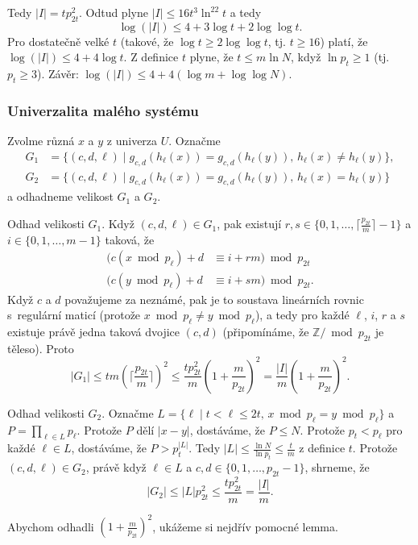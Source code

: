 \documentclass[a4paper,12pt]{article}
\begin{document}
Tedy $|I|=tp_{2t}^2$.   
Odtud plyne $|I|\le 16t^3\ln^22t$ a tedy 
$$\log(|I|)\le 4+3\log t+2\log\log t.$$
Pro dostatečně velké $t$ (takové, že $\log t\ge 2\log\log 
t$, tj. $t\ge 16$) platí, 
že $\log(|I|)\le 4+4\log t$.  Z definice $t$ plyne, 
že $t\le m\ln N$, když $\ln p_t\ge 1$ (tj.  $p_t\ge 3$).\newline 
Závěr: $\log(|I|)\le 4+4(\log m+\log\log N)$. 

\subsubsection{Univerzalita malého systému}

Zvolme různá $x$ a $y$ z univerza $U$. 
Označme
\begin{align*} G_1&=\{(c,d,\ell )\mid g_{c,d}(h_{\ell}(x))=g_{c,d}(h_{\ell}
(y)),\,h_{\ell}(x)\ne h_{\ell}(y)\},\\
G_2&=\{(c,d,\ell )\mid g_{c,d}(h_{\ell}(x))=g_{c,d}(h_{\ell}(y)),\,
h_{\ell}(x)=h_{\ell}(y)\}\end{align*}
a odhadneme velikost $G_1$ a $G_2$. 

Odhad velikosti $G_1$. Když $(c,d,\ell )\in G_1$, pak 
existují $r,s\in \{0,1,\dots,\lceil\frac {p_{2t}}m\rceil -1\}$ a $
i\in \{0,1,\dots,m-1\}$ 
taková, že 
\begin{align*}(c(x\bmod p_{\ell})+d&\equiv i+rm)\bmod p_{2t}\\
(c(y\bmod p_{\ell})+d&\equiv i+sm)\bmod p_{2t}.\end{align*}
Když $c$ a $d$ považujeme za neznámé, pak je to  
soustava lineár\-ních rovnic s~regulární maticí (protože 
$x\bmod p_{\ell}\ne y\bmod p_{\ell}$), a tedy pro každé $\ell$, $
i$, $r$ a $s$ 
existuje právě jedna taková dvojice $(c,d)$ (připomínáme, že $\mathbb Z/\bmod p_{2t}$ je těleso). Proto 
$$|G_1|\le tm(\lceil\frac {p_{2t}}m\rceil )^2\le\frac {tp_{2t}^2}
m(1+\frac m{p_{2t}})^2=\frac {|I|}m(1+\frac m{p_{2t}})^2.$$

Odhad velikosti $G_2$. Označme 
$L=\{\ell\mid t<\ell\le 2t,\,x\bmod p_{\ell}=y\bmod p_{\ell}\}$ a $
P=\prod_{\ell\in L}p_{\ell}$. 
Protože $P$ dělí $|x-y|$, dostáváme, že $P\le N$. Protože 
$p_t<p_{\ell}$ pro každé $\ell\in L$, dostáváme, že $
P>p_t^{|L|}$. Tedy 
$|L|\le\frac {\ln N}{\ln p_t}\le\frac tm$ z definice $t$. Protože $
(c,d,\ell )\in G_2$, právě 
když $\ell\in L$ a $c,d\in \{0,1,\dots,p_{2t}-1\}$, shrneme, že 
$$|G_2|\le |L|p_{2t}^2\le\frac {tp_{2t}^2}m=\frac {|I|}m.$$

Abychom odhadli $(1+\frac m{p_{2t}})^2$, ukážeme si nejdřív 
pomocné lem\-ma.
\end{document}
